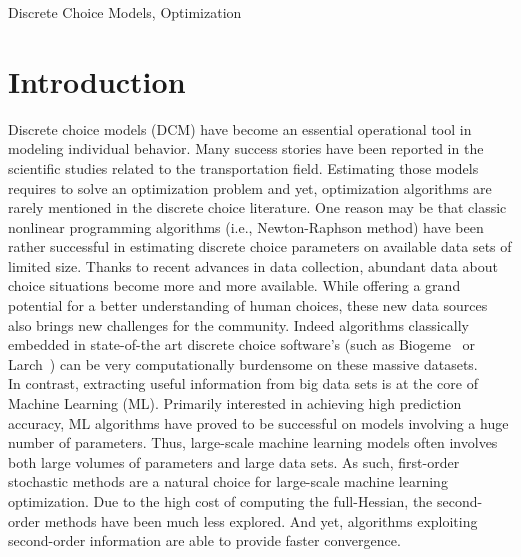 \documentclass[conference]{IEEEtran}
\begin{document}
\begin{IEEEkeywords}
Discrete Choice Models, Optimization
\end{IEEEkeywords}

\section{Introduction}
\label{sec:intro}

Discrete choice models (DCM) have become an essential operational tool in modeling individual behavior. Many success stories have been reported in the scientific studies related to the transportation field. Estimating those models requires to solve an optimization problem and yet, optimization algorithms are rarely mentioned in the discrete choice literature. One reason may be that classic nonlinear programming algorithms (i.e., Newton-Raphson method) have been rather successful in estimating discrete choice parameters on available data sets of limited size. Thanks to recent advances in data collection, abundant data about choice situations become more and more available. While offering a grand potential for a better understanding of human choices, these new data sources also brings new challenges for the community. Indeed algorithms classically embedded in state-of-the art discrete choice software's (such as Biogeme~\cite{bierlaire_biogeme:_2003} or Larch~\cite{newman_larch:_2016}) can be very computationally burdensome on these massive datasets. \\

In contrast, extracting useful information from big data sets is at the core of Machine Learning (ML). Primarily interested in achieving high prediction accuracy, ML algorithms have proved to be successful on models involving a huge number of parameters. Thus, large-scale machine learning models often involves both large volumes of parameters and large data sets. As such, first-order stochastic methods are a natural choice for large-scale machine learning optimization.  Due to the high cost of computing the full-Hessian, the second-order methods have been much less explored. And yet, algorithms exploiting second-order information are able to provide faster convergence. \\
\end{document}
